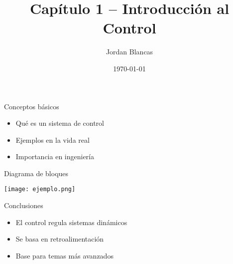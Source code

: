 \documentclass{beamer}
\title{Capítulo 1 – Introducción al Control}
\author{Jordan Blancas}
\date{\today}
\begin{document}
\begin{frame}
  \titlepage
\end{frame}

\begin{frame}{Conceptos básicos}
  \begin{itemize}
    \item Qué es un sistema de control
    \item Ejemplos en la vida real
    \item Importancia en ingeniería
  \end{itemize}
\end{frame}

\begin{frame}{Diagrama de bloques}
  \begin{center}
    \texttt{[image: ejemplo.png]} %
  \end{center}
\end{frame}

\begin{frame}{Conclusiones}
  \begin{itemize}
    \item El control regula sistemas dinámicos
    \item Se basa en retroalimentación
    \item Base para temas más avanzados
  \end{itemize}
\end{frame}
\end{document}
